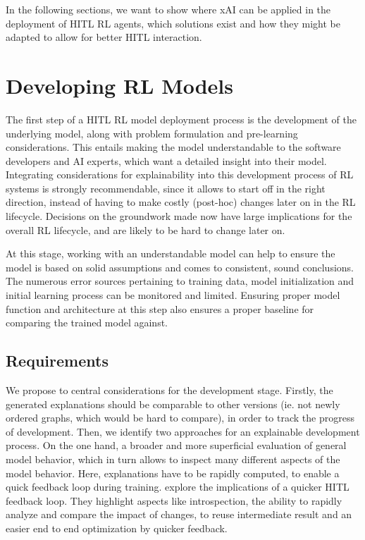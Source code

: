 \documentclass[twoside,11pt]{article}
\begin{document}
In the following sections, we want to show where xAI can be applied in the deployment of HITL RL agents, which solutions exist and how they might be adapted to allow for better HITL interaction.
\section{Developing RL Models}

The first step of a HITL RL model deployment process is the development of the underlying model, along with problem formulation and pre-learning considerations. This entails making the model understandable to the software developers and AI experts, which want a detailed insight into their model. 
Integrating considerations for explainability into this development process of RL systems is strongly recommendable, since it allows to start off in the right direction, instead of having to make costly (post-hoc) changes later on in the RL lifecycle. Decisions on the groundwork made now have large implications for the overall RL lifecycle, and are likely to be hard to change later on.

At this stage, working with an understandable model can help to ensure the model is based on solid assumptions and comes to consistent, sound conclusions. The numerous error sources pertaining to training data, model initialization and initial learning process can be monitored and limited. Ensuring proper model function and architecture at this step also ensures a proper baseline for comparing the trained model against.

\subsection{Requirements}
We propose to central considerations for the development stage. Firstly, the generated explanations should be comparable to other versions (ie. not newly ordered graphs, which would be hard to compare), in order to track the progress of development. 
Then, we identify two approaches for an explainable development process. On the one hand, a broader and more superficial evaluation of general model behavior, which in turn allows to inspect many different aspects of the model behavior. Here, explanations have to be rapidly computed, to enable a quick feedback loop during training. 
\citet{XinEtAl:2018:HITLMLFeedbackLoop} explore the implications of a quicker HITL feedback loop. They highlight aspects like introspection, the ability to rapidly analyze and compare the impact of changes, to reuse intermediate result and an easier end to end optimization by quicker feedback.
\end{document}
